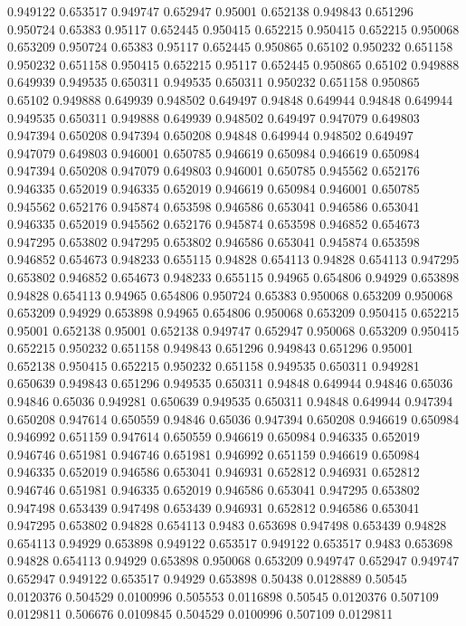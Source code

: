 0.949122 0.653517
0.949747 0.652947
0.95001 0.652138
0.949843 0.651296
0.950724 0.65383
0.95117 0.652445
0.950415 0.652215
0.950415 0.652215
0.950068 0.653209
0.950724 0.65383
0.95117 0.652445
0.950865 0.65102
0.950232 0.651158
0.950232 0.651158
0.950415 0.652215
0.95117 0.652445
0.950865 0.65102
0.949888 0.649939
0.949535 0.650311
0.949535 0.650311
0.950232 0.651158
0.950865 0.65102
0.949888 0.649939
0.948502 0.649497
0.94848 0.649944
0.94848 0.649944
0.949535 0.650311
0.949888 0.649939
0.948502 0.649497
0.947079 0.649803
0.947394 0.650208
0.947394 0.650208
0.94848 0.649944
0.948502 0.649497
0.947079 0.649803
0.946001 0.650785
0.946619 0.650984
0.946619 0.650984
0.947394 0.650208
0.947079 0.649803
0.946001 0.650785
0.945562 0.652176
0.946335 0.652019
0.946335 0.652019
0.946619 0.650984
0.946001 0.650785
0.945562 0.652176
0.945874 0.653598
0.946586 0.653041
0.946586 0.653041
0.946335 0.652019
0.945562 0.652176
0.945874 0.653598
0.946852 0.654673
0.947295 0.653802
0.947295 0.653802
0.946586 0.653041
0.945874 0.653598
0.946852 0.654673
0.948233 0.655115
0.94828 0.654113
0.94828 0.654113
0.947295 0.653802
0.946852 0.654673
0.948233 0.655115
0.94965 0.654806
0.94929 0.653898
0.94828 0.654113
0.94965 0.654806
0.950724 0.65383
0.950068 0.653209
0.950068 0.653209
0.94929 0.653898
0.94965 0.654806
0.950068 0.653209
0.950415 0.652215
0.95001 0.652138
0.95001 0.652138
0.949747 0.652947
0.950068 0.653209
0.950415 0.652215
0.950232 0.651158
0.949843 0.651296
0.949843 0.651296
0.95001 0.652138
0.950415 0.652215
0.950232 0.651158
0.949535 0.650311
0.949281 0.650639
0.949843 0.651296
0.949535 0.650311
0.94848 0.649944
0.94846 0.65036
0.94846 0.65036
0.949281 0.650639
0.949535 0.650311
0.94848 0.649944
0.947394 0.650208
0.947614 0.650559
0.94846 0.65036
0.947394 0.650208
0.946619 0.650984
0.946992 0.651159
0.947614 0.650559
0.946619 0.650984
0.946335 0.652019
0.946746 0.651981
0.946746 0.651981
0.946992 0.651159
0.946619 0.650984
0.946335 0.652019
0.946586 0.653041
0.946931 0.652812
0.946931 0.652812
0.946746 0.651981
0.946335 0.652019
0.946586 0.653041
0.947295 0.653802
0.947498 0.653439
0.947498 0.653439
0.946931 0.652812
0.946586 0.653041
0.947295 0.653802
0.94828 0.654113
0.9483 0.653698
0.947498 0.653439
0.94828 0.654113
0.94929 0.653898
0.949122 0.653517
0.949122 0.653517
0.9483 0.653698
0.94828 0.654113
0.94929 0.653898
0.950068 0.653209
0.949747 0.652947
0.949747 0.652947
0.949122 0.653517
0.94929 0.653898
0.50438 0.0128889
0.50545 0.0120376
0.504529 0.0100996
0.505553 0.0116898
0.50545 0.0120376
0.507109 0.0129811
0.506676 0.0109845
0.504529 0.0100996
0.507109 0.0129811
